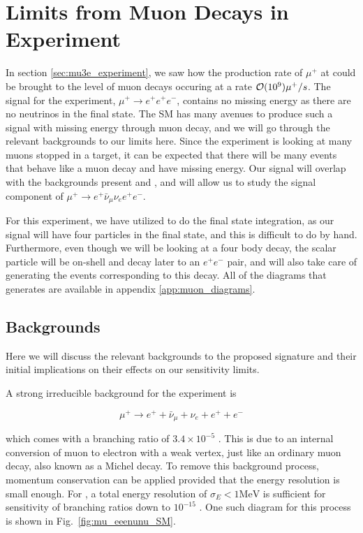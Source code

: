 \section{Limits from Muon Decays in \mueee Experiment}
In section \ref{sec:mu3e_experiment}, we saw how the production rate of $\mu^+$ at \mueee could be brought to the level of muon decays occuring at a rate $\operatorname{\mathcal{O}}(10^9) \mu^+/s$.
The signal for the \mueee experiment, $\mu^+ \rightarrow e^+ e^+ e^-$, contains no missing energy as there are no neutrinos in the final state.
The SM has many avenues to produce such a signal with missing energy through muon decay, and we will go through the relevant backgrounds to our limits here.
Since the experiment is looking at many muons stopped in a target, it can be expected that there will be many events that behave like a muon decay and have missing energy.
Our signal will overlap with the backgrounds present and \mueee, and will allow us to study the signal component of $\mu^+ \rightarrow e^+ \bar{\nu}_\mu \nu_e e^+ e^-$.

For this experiment, we have utilized \madgraph to do the final state integration, as our signal will have four particles in the final state, and this is difficult to do by hand.
Furthermore, even though we will be looking at a four body decay, the scalar particle will be on-shell and decay later to an $e^+ e^-$ pair, and \madgraph will also take care of generating the events corresponding to this decay.
All of the diagrams that \madgraph generates are available in appendix \ref{app:muon_diagrams}.

\subsection{Backgrounds}
Here we will discuss the relevant backgrounds to the proposed signature and their initial implications on their effects on our sensitivity limits.

A strong irreducible background for the experiment is

\begin{equation}
    \mu^+ \rightarrow e^+ + \bar{\nu}_\mu + \nu_e + e^+ + e^-
\end{equation}

\noindent which comes with a branching ratio of $3.4 \times 10^{-5}$ \cite{Agashe:2014kda}. 
This is due to an internal conversion of muon to electron with a weak vertex, just like an ordinary muon decay, also known as a Michel decay.
To remove this background process, momentum conservation can be applied provided that the energy resolution is small enough.
For \mueee, a total energy resolution of $\sigma_E < 1\textrm{MeV}$ is sufficient for sensitivity of branching ratios down to $10^{-15}$ \cite{Blondel:2013ia}.
One such diagram for this process is shown in Fig.\ \ref{fig:mu_eeenunu_SM}.

